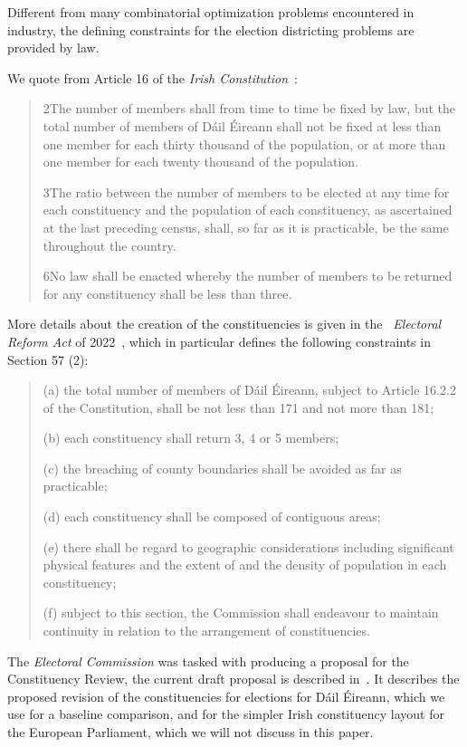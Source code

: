 \documentclass[runningheads]{llncs}
\begin{document}
Different from many combinatorial optimization problems encountered in industry, the defining constraints for the election districting problems are provided by law. 

We quote from Article 16 of the \emph{Irish Constitution}~\cite{Ireland2020}:
\begin{quote}
2\textdegree The number of members shall from time to time be fixed by law, but the total number of members of Dáil Éireann shall not be fixed at less than one member for each thirty thousand of the population, or at more than one member for each twenty thousand of the population.

3\textdegree The ratio between the number of members to be elected at any time for each constituency and the population of each constituency, as ascertained at the last preceding census, shall, so far as it is practicable, be the same throughout the country.

6\textdegree No law shall be enacted whereby the number of members to be returned for any constituency shall be less than three.
\end{quote}

More details about the creation of the constituencies is given in the ~\emph{Electoral Reform Act} of 2022~\cite{Ireland2022}, which in particular defines the following constraints in Section 57 (2):

\begin{quote}
(a) the total number of members of Dáil Éireann, subject to Article 16.2.2 of the Constitution, shall be not less than 171 and not more than 181;

(b) each constituency shall return 3, 4 or 5 members;

(c) the breaching of county boundaries shall be avoided as far as practicable;

(d) each constituency shall be composed of contiguous areas;

(e) there shall be regard to geographic considerations including significant physical features and the extent of and the density of population in each constituency;

(f) subject to this section, the Commission shall endeavour to maintain continuity in relation to the arrangement of constituencies.
\end{quote}


The \emph{Electoral Commission} was tasked with producing a proposal for the Constituency Review, the current draft proposal is described in~\cite{ElectoralCommission2023}. It describes the proposed revision of the constituencies for elections for Dáil Éireann, which we use for a baseline comparison, and for the simpler Irish constituency layout for the European Parliament, which we will not discuss in this paper.
\end{document}
